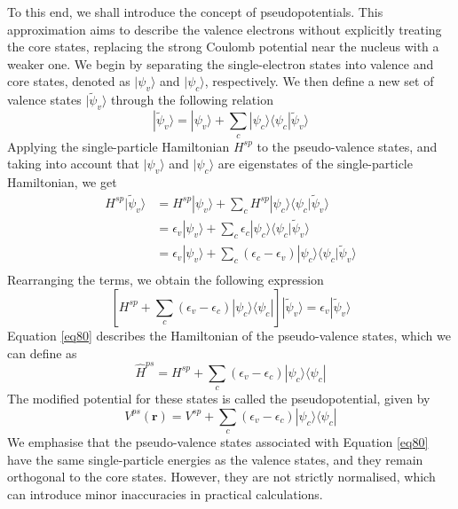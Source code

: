 To this end, we shall introduce the concept of pseudopotentials\supercite{Hellmann1935}. This approximation aims to describe the valence electrons without explicitly treating the core states, replacing the strong Coulomb potential near the nucleus with a weaker one. We begin by separating the single-electron states into valence and core states, denoted as $|\psi_{v}\rangle$ and $|\psi_{c}\rangle$, respectively. We then define a new set of valence states $|\tilde{\psi}_{v}\rangle$  through the following relation 
\begin{equation}
    \label{eq78}
    |\tilde{\psi}_{v}\rangle = |\psi_{v}\rangle + \sum_{c} |\psi_{c}\rangle 
    \langle \psi_{c} |\tilde{\psi}_{v}\rangle
\end{equation}
Applying the single-particle Hamiltonian $H^{sp}$ to the pseudo-valence states, and taking into account that $|\psi_{v}\rangle$ and $|\psi_{c}\rangle$ are eigenstates of the single-particle Hamiltonian, we get
\begin{equation}
    \label{eq79}
    \begin{aligned}
    H^{sp} |\tilde{\psi}_{v}\rangle &= H^{sp}|\psi_{v}\rangle  + 
    \sum_{c} H^{sp}|\psi_{c}\rangle \langle \psi_{c} |\tilde{\psi}_{v}\rangle\\
    &= \epsilon_{v} |\psi_{v}\rangle + \sum_{c} \epsilon_{c} |\psi_{c}\rangle
    \langle \psi_{c} |\tilde{\psi}_{v}\rangle\\
    &= \epsilon_{v} |\psi_{v}\rangle + \sum_{c} (\epsilon_{c} - \epsilon_{v}) |\psi_{c}\rangle
    \langle \psi_{c} |\tilde{\psi}_{v}\rangle\\
    \end{aligned}
\end{equation}
Rearranging the terms, we obtain the following expression
\begin{equation}
    \label{eq80}
    \left[H^{sp} + \sum_{c} (\epsilon_{v} - \epsilon_{c})|\psi_{c}\rangle \langle \psi_{c} | \right] 
    |\tilde{\psi}_{v}\rangle = \epsilon_{v} |\tilde{\psi}_{v}\rangle
\end{equation}
Equation \ref{eq80} describes the Hamiltonian of the pseudo-valence states, which we can define as 
\begin{equation}
    \label{eq81}
    \hat{H}^{ps} = H^{sp} + \sum_{c} (\epsilon_{v} - \epsilon_{c})|\psi_{c}\rangle \langle \psi_{c} |
\end{equation}
The modified potential for these states is called the pseudopotential, given by 
\begin{equation}
    \label{eq82}
    V^{ps}(\mathbf{r}) = V^{sp} + \sum_{c} (\epsilon_{v} - \epsilon_{c})|\psi_{c}\rangle \langle \psi_{c} |
\end{equation}
We emphasise that the pseudo-valence states associated with Equation \ref{eq80} have the same single-particle energies as the valence states, and they remain orthogonal to the core states. However, they are not strictly normalised, which can introduce minor inaccuracies in practical calculations. 


